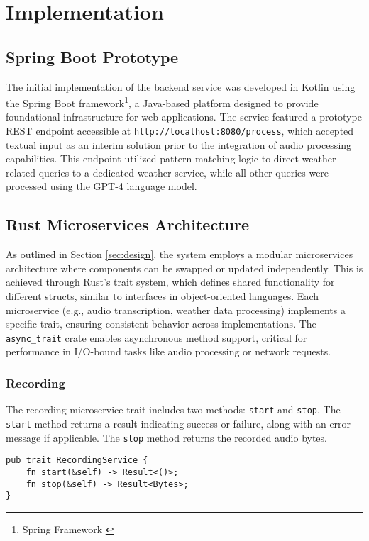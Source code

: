 \renewcommand*\chapterpagestyle{scrheadings}
\chapter{Implementation}

\section{Spring Boot Prototype}
The initial implementation of the backend service was developed in Kotlin using the Spring Boot framework\footnote{Spring Framework \cite{spring}}, a Java-based platform designed to provide foundational infrastructure for web applications. The service featured a prototype REST endpoint accessible at \texttt{http://localhost:8080/process}, which accepted textual input as an interim solution prior to the integration of audio processing capabilities. This endpoint utilized pattern-matching logic to direct weather-related queries to a dedicated weather service, while all other queries were processed using the GPT-4 language model.

\section{Rust Microservices Architecture}
As outlined in Section \ref{sec:design}, the system employs a modular microservices architecture where components can be swapped or updated independently.
This is achieved through Rust's trait system, which defines shared functionality for different structs, similar to interfaces in object-oriented languages.
Each microservice (e.g., audio transcription, weather data processing) implements a specific trait, ensuring consistent behavior across implementations.
The \texttt{async\_trait} crate enables asynchronous method support, critical for performance in I/O-bound tasks like audio processing or network requests.

\subsection{Recording}
The recording microservice trait includes two methods: \texttt{start} and \texttt{stop}.
The \texttt{start} method returns a result indicating success or failure, along with an error message if applicable.
The \texttt{stop} method returns the recorded audio bytes.

\begin{verbatim}
pub trait RecordingService {
    fn start(&self) -> Result<()>;
    fn stop(&self) -> Result<Bytes>;
}
\end{verbatim}

